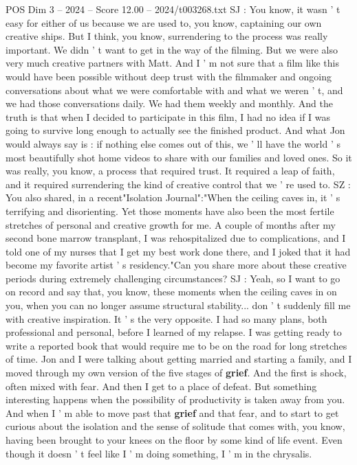 \begin{textsample}{POS Dim 3 – 2024 – Score 12.00 – 2024/t003268.txt}
SJ : You know, it wasn ' t easy for either of us because we are used to, you know, captaining our own creative ships.
But I think, you know, surrendering to the process was really important.
We didn ' t want to get in the way of the filming.
But we were also very much creative partners with Matt.
And I ' m not sure that a film like this would have been possible without deep trust with the filmmaker and ongoing conversations about what we were comfortable with and what we weren ' t, and we had those conversations daily.
We had them weekly and monthly.
And the truth is that when I decided to participate in this film, I had no idea if I was going to survive long enough to actually see the finished product.
And what Jon would always say is : if nothing else comes out of this, we ' ll have the world ' s most beautifully shot home videos to share with our families and loved ones.
So it was really, you know, a process that required trust.
It required a leap of faith, and it required surrendering the kind of creative control that we ' re used to.
SZ : You also shared, in a recent"Isolation Journal":"When the ceiling caves in, it ' s terrifying and disorienting.
Yet those moments have also been the most fertile stretches of personal and creative growth for me.
A couple of months after my second bone marrow transplant, I was rehospitalized due to complications, and I told one of my nurses that I get my best work done there, and I joked that it had become my favorite artist ' s residency."Can you share more about these creative periods during extremely challenging circumstances?
SJ : Yeah, so I want to go on record and say that, you know, these moments when the ceiling caves in on you, when you can no longer assume structural stability... don ' t suddenly fill me with creative inspiration.
It ' s the very opposite.
I had so many plans, both professional and personal, before I learned of my relapse.
I was getting ready to write a reported book that would require me to be on the road for long stretches of time.
Jon and I were talking about getting married and starting a family, and I moved through my own version of the five stages of \textbf{grief}.
And the first is shock, often mixed with fear.
And then I get to a place of defeat.
But something interesting happens when the possibility of productivity is taken away from you.
And when I ' m able to move past that \textbf{grief} and that fear, and to start to get curious about the isolation and the sense of solitude that comes with, you know, having been brought to your knees on the floor by some kind of life event.
Even though it doesn ' t feel like I ' m doing something, I ' m in the chrysalis.

\end{textsample}
